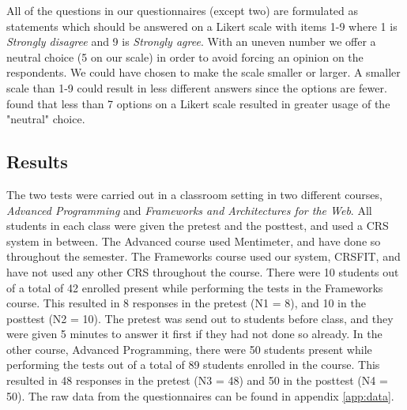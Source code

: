 All of the questions in our questionnaires (except two) are formulated as statements which should be answered on a Likert scale \cite{likert1932technique} with items 1-9 where 1 is \emph{Strongly disagree} and 9 is \emph{Strongly agree}. With an uneven number we offer a neutral choice (5 on our scale) in order to avoid forcing an opinion on the respondents. We could have chosen to make the scale smaller or larger. A smaller scale than 1-9 could result in less different answers since the options are fewer.  found that less than 7 options on a Likert scale resulted in greater usage of the "neutral" choice. %




\subsection{Results}

The two tests were carried out in a classroom setting in two different courses, \emph{Advanced Programming} and \emph{Frameworks and Architectures for the Web}. All students in each class were given the pretest and the posttest, and used a CRS system in between. The Advanced course used Mentimeter, and have done so throughout the semester. The Frameworks course used our system, CRSFIT, and have not used any other CRS throughout the course.
There were 10 students out of a total of 42 enrolled present while performing the tests in the Frameworks course. This resulted in 8 responses in the pretest (N1 = 8), and 10 in the posttest (N2 = 10). The pretest was send out to students before class, and they were given 5 minutes to answer it first if they had not done so already.
In the other course, Advanced Programming, there were 50 students present while performing the tests out of a total of 89 students enrolled in the course. This resulted in 48 responses in the pretest (N3 = 48) and 50 in the posttest (N4 = 50). 
The raw data from the questionnaires can be found in appendix \ref{app:data}.

